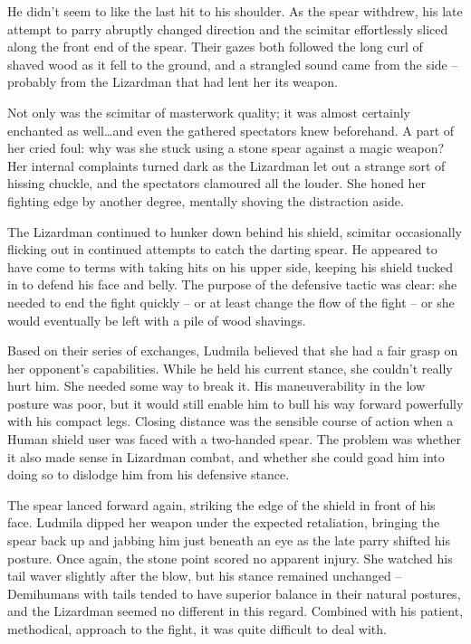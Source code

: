  

He didn’t seem to like the last hit to his shoulder. As the spear withdrew, his late attempt to parry abruptly changed direction and the scimitar effortlessly sliced along the front end of the spear. Their gazes both followed the long curl of shaved wood as it fell to the ground, and a strangled sound came from the side – probably from the Lizardman that had lent her its weapon.

 

Not only was the scimitar of masterwork quality; it was almost certainly enchanted as well…and even the gathered spectators knew beforehand. A part of her cried foul: why was she stuck using a stone spear against a magic weapon? Her internal complaints turned dark as the Lizardman let out a strange sort of hissing chuckle, and the spectators clamoured all the louder. She honed her fighting edge by another degree, mentally shoving the distraction aside.

 

The Lizardman continued to hunker down behind his shield, scimitar occasionally flicking out in continued attempts to catch the darting spear. He appeared to have come to terms with taking hits on his upper side, keeping his shield tucked in to defend his face and belly. The purpose of the defensive tactic was clear: she needed to end the fight quickly – or at least change the flow of the fight – or she would eventually be left with a pile of wood shavings.

 

Based on their series of exchanges, Ludmila believed that she had a fair grasp on her opponent’s capabilities. While he held his current stance, she couldn’t really hurt him. She needed some way to break it. His maneuverability in the low posture was poor, but it would still enable him to bull his way forward powerfully with his compact legs. Closing distance was the sensible course of action when a Human shield user was faced with a two-handed spear. The problem was whether it also made sense in Lizardman combat, and whether she could goad him into doing so to dislodge him from his defensive stance.

 

The spear lanced forward again, striking the edge of the shield in front of his face. Ludmila dipped her weapon under the expected retaliation, bringing the spear back up and jabbing him just beneath an eye as the late parry shifted his posture. Once again, the stone point scored no apparent injury. She watched his tail waver slightly after the blow, but his stance remained unchanged – Demihumans with tails tended to have superior balance in their natural postures, and the Lizardman seemed no different in this regard. Combined with his patient, methodical, approach to the fight, it was quite difficult to deal with.

